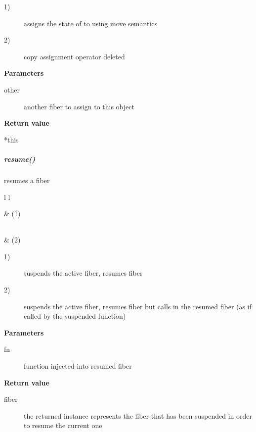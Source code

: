 \begin{description}
    \item[1)] assigns the state of  to  using move semantics
    \item[2)] copy assignment operator deleted
\end{description}

{\bfseries Parameters}
\begin{description}
    \item[other]   another fiber to assign to this object\\
\end{description}

{\bfseries Return value}
\begin{description}
    \item[*this]
\end{description}


\subparagraph*{resume()}
resumes a fiber\\

\begin{tabular}{ l l }
    \midrule

     & (1)\\

    \midrule

    \\
     & (2)\\

    \midrule
\end{tabular}

\begin{description}
    \item[1)] suspends the active fiber, resumes fiber 
    \item[2)] suspends the active fiber, resumes fiber 
              but calls  in the resumed fiber (as if called by the
              suspended function)
\end{description}

{\bfseries Parameters}
\begin{description}
    \item[fn] function injected into resumed fiber\\
\end{description}

{\bfseries Return value}
\begin{description}
    \item[fiber] the returned instance represents the fiber that has been
                 suspended in order to resume the current one
\end{description}

